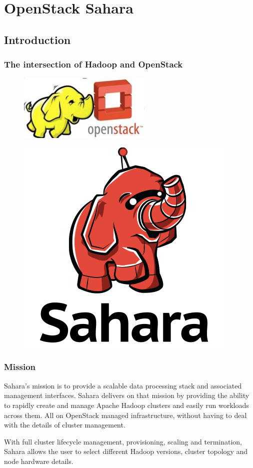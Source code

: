 \section{OpenStack Sahara}

\subsection{Introduction}
\begin{frame}
	\frametitle{The intersection of Hadoop and OpenStack}
	\begin{figure}
		\includegraphics[width=0.2\linewidth]{images/hadoop-openstack.jpg}
	\end{figure}
	\begin{figure}
		\includegraphics[width=0.4\linewidth]{images/sahara-logo-square.png}
	\end{figure}
\end{frame}


\begin{frame}
	\frametitle{Mission}
Sahara’s mission is to provide a scalable data processing stack and associated management interfaces. Sahara delivers on that mission by providing the ability to rapidly create and manage Apache Hadoop clusters and easily run workloads across them. All on OpenStack managed infrastructure, without having to deal with the details of cluster management.

With full cluster lifecycle management, provisioning, scaling and termination, Sahara allows the user to select different Hadoop versions, cluster topology and node hardware details.
\end{frame}

